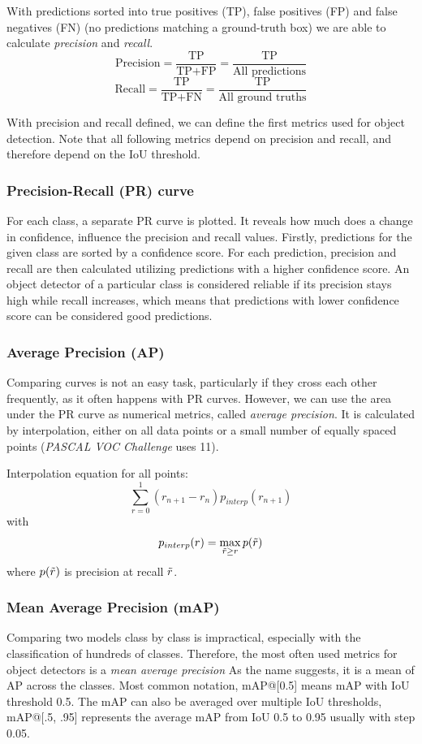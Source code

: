 With predictions sorted into true positives (TP), false positives (FP) and false negatives (FN) (no predictions matching a ground-truth box) we are able to calculate \textit{precision} and \textit{recall}.
$$\text{Precision} = \frac{\text{TP}}{\text{TP}+\text{FP}} = \frac{\text{TP}}{\text{All predictions}}$$
$$\text{Recall} = \frac{\text{TP}}{\text{TP}+\text{FN}} = \frac{\text{TP}}{\text{All ground truths}}$$

With precision and recall defined, we can define the first metrics used for object detection. Note that all following metrics depend on precision and recall, and therefore depend on the IoU threshold.

\subsubsection{Precision-Recall (PR) curve}
For each class, a separate PR curve is plotted. It reveals how much does a change in confidence, influence the precision and recall values. Firstly, predictions for the given class are sorted by a confidence score. For each prediction, precision and recall are then calculated utilizing predictions with a higher confidence score. An object detector of a particular class is considered reliable if its precision stays high while recall increases, which means that predictions with lower confidence score can be considered good predictions.

\subsubsection{Average Precision (AP)}
Comparing curves is not an easy task, particularly if they cross each other frequently, as it often happens with PR curves. However, we can use the area under the PR curve as numerical metrics, called \textit{average precision}. It is calculated by interpolation, either on all data points or a small number of equally spaced points (\textit{PASCAL VOC Challenge} uses 11).

Interpolation equation for all points:
$$\sum_{r=0}^1 (r_{n+1} - r_n ) p_{interp}(r_{n+1})$$
with
$$p_{interp}(r) = \max_{\Tilde{r} \geq r} p(\Tilde{r})$$
where $p(\Tilde{r})$ is precision at recall $\Tilde{r}$.

\subsubsection{Mean Average Precision (mAP)}
Comparing two models class by class is impractical, especially with the classification of hundreds of classes. Therefore, the most often used metrics for object detectors is a \textit{mean average precision} As the name suggests, it is a mean of AP across the classes. Most common notation, mAP@[0.5] means mAP with IoU threshold 0.5. The mAP can also be averaged over multiple IoU thresholds, mAP@[.5, .95] represents the average mAP from IoU 0.5 to 0.95 usually with step 0.05.


